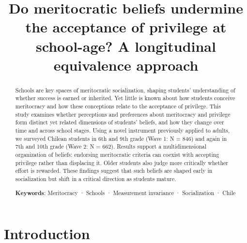 \documentclass[
  13pt,
]{article}
\author{}
\title{Do meritocratic beliefs undermine the acceptance of privilege at
school-age? A longitudinal equivalence approach}
\date{}
\begin{document}
\maketitle
\begin{abstract}
Schools are key spaces of meritocratic socialization, shaping students'
understanding of whether success is earned or inherited. Yet little is
known about how students conceive meritocracy and how these conceptions
relate to the acceptance of privilege. This study examines whether
perceptions and preferences about meritocracy and privilege form
distinct yet related dimensions of students' beliefs, and how they
change over time and across school stages. Using a novel instrument
previously applied to adults, we surveyed Chilean students in 6th and
9th grade (Wave 1: N = 846) and again in 7th and 10th grade (Wave 2: N =
662). Results support a multidimensional organization of beliefs:
endorsing meritocratic criteria can coexist with accepting privilege
rather than displacing it. Older students also judge more critically
whether effort is rewarded. These findings suggest that such beliefs are
shaped early in socialization but shift in a critical direction as
students mature.

\textbf{Keywords}: Meritocracy · Schools · Measurement invariance ·
Socialization · Chile
\end{abstract}


\section{Introduction}\label{introduction}
\end{document}
